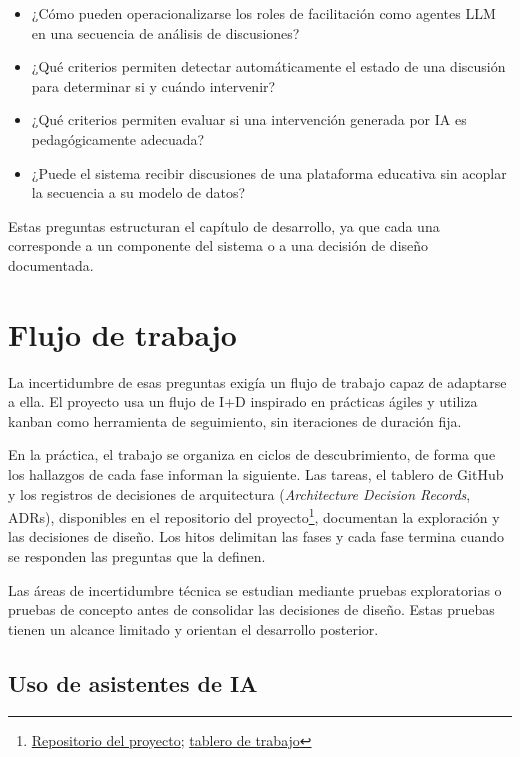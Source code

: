 \begin{itemize}
  \item ¿Cómo pueden operacionalizarse los roles de facilitación como agentes LLM en una secuencia de análisis de discusiones?
  \item ¿Qué criterios permiten detectar automáticamente el estado de una discusión para determinar si y cuándo intervenir?
  \item ¿Qué criterios permiten evaluar si una intervención generada por IA es pedagógicamente adecuada?
  \item ¿Puede el sistema recibir discusiones de una plataforma educativa sin acoplar la secuencia a su modelo de datos?
\end{itemize}

Estas preguntas estructuran el capítulo de desarrollo, ya que cada una corresponde a un componente del sistema o a una decisión de diseño documentada.

\section{Flujo de trabajo}

La incertidumbre de esas preguntas exigía un flujo de trabajo capaz de adaptarse a ella. El proyecto usa un flujo de I+D inspirado en prácticas ágiles y utiliza kanban como herramienta de seguimiento, sin iteraciones de duración fija.

En la práctica, el trabajo se organiza en ciclos de descubrimiento, de forma que los hallazgos de cada fase informan la siguiente. Las tareas, el tablero de GitHub y los registros de decisiones de arquitectura (\textit{Architecture Decision Records}, ADRs), disponibles en el repositorio del proyecto\footnote{\href{https://github.com/magrimal/tfm-2026-discussion-moderation}{Repositorio del proyecto}; \href{https://github.com/users/magrimal/projects/3/views/1}{tablero de trabajo}}, documentan la exploración y las decisiones de diseño. Los hitos delimitan las fases y cada fase termina cuando se responden las preguntas que la definen.

Las áreas de incertidumbre técnica se estudian mediante pruebas exploratorias o pruebas de concepto antes de consolidar las decisiones de diseño. Estas pruebas tienen un alcance limitado y orientan el desarrollo posterior.

\subsection{Uso de asistentes de IA}

